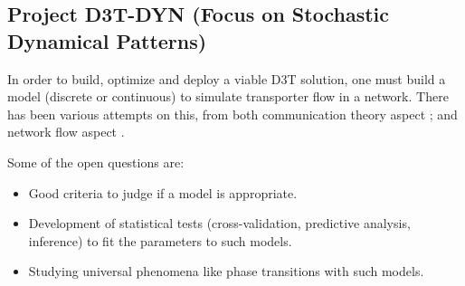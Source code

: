 \subsection*{Project D3T-DYN (Focus on Stochastic Dynamical Patterns)}

In order to  build, optimize and deploy a viable D3T solution, one must build a model
(discrete or continuous) to simulate transporter flow in a network. There has been various attempts on this,
from both communication theory aspect \cite{zhang_communication_2011, arenas_communication_2001}; and network flow aspect
\cite{de_martino_minimal_2009,sole-ribalta_model_2016,tan_hybrid_2013}. 

Some of the open questions are:
\begin{itemize}
\item Good criteria to judge if a model is appropriate. 
\item Development of statistical tests (cross-validation, predictive analysis, inference) to fit the parameters to such models. 
\item Studying universal phenomena like phase transitions with such models.
\end{itemize}